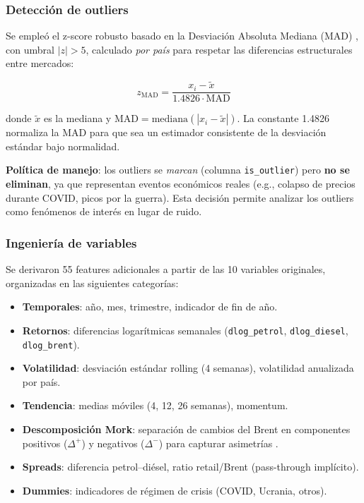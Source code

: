 \documentclass[stu, 12pt, a4paper, biblatex, donotrepeattitle]{apa7}
\begin{document}
\subsubsection{Detección de outliers}

Se empleó el z-score robusto basado en la Desviación Absoluta Mediana (MAD) \parencite{lundbergh2002}, con umbral $|z| > 5$, calculado \emph{por país} para respetar las diferencias estructurales entre mercados:

\begin{equation}
z_{\text{MAD}} = \frac{x_i - \widetilde{x}}{1.4826 \cdot \text{MAD}}
\end{equation}

donde $\widetilde{x}$ es la mediana y $\text{MAD} = \text{mediana}(|x_i - \widetilde{x}|)$. La constante 1.4826 normaliza la MAD para que sea un estimador consistente de la desviación estándar bajo normalidad.

\textbf{Política de manejo}: los outliers se \emph{marcan} (columna \texttt{is\_outlier}) pero \textbf{no se eliminan}, ya que representan eventos económicos reales (e.g., colapso de precios durante COVID, picos por la guerra). Esta decisión permite analizar los outliers como fenómenos de interés en lugar de ruido.

\subsubsection{Ingeniería de variables}

Se derivaron 55 features adicionales a partir de las 10 variables originales, organizadas en las siguientes categorías:

\begin{itemize}
  \item \textbf{Temporales}: año, mes, trimestre, indicador de fin de año.
  \item \textbf{Retornos}: diferencias logarítmicas semanales (\texttt{dlog\_petrol}, \texttt{dlog\_diesel}, \texttt{dlog\_brent}).
  \item \textbf{Volatilidad}: desviación estándar rolling (4 semanas), volatilidad anualizada por país.
  \item \textbf{Tendencia}: medias móviles (4, 12, 26 semanas), momentum.
  \item \textbf{Descomposición Mork}: separación de cambios del Brent en componentes positivos ($\Delta^+$) y negativos ($\Delta^-$) para capturar asimetrías \parencite{mork1989}.
  \item \textbf{Spreads}: diferencia petrol--diésel, ratio retail/Brent (pass-through implícito).
  \item \textbf{Dummies}: indicadores de régimen de crisis (COVID, Ucrania, otros).
\end{itemize}
\end{document}
